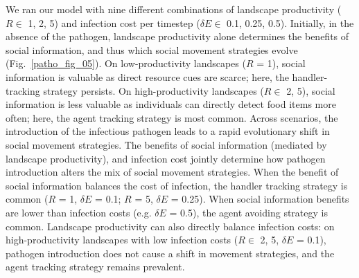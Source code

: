 We ran our model with nine different combinations of landscape productivity ($R \in $ 1, 2, 5) and infection cost per timestep ($\delta E \in$ 0.1, 0.25, 0.5).
Initially, in the absence of the pathogen, landscape productivity alone determines the benefits of social information, and thus which social movement strategies evolve (Fig.~\ref{patho_fig_05}).
On low-productivity landscapes ($R$ = 1), social information is valuable as direct resource cues are scarce; here, the handler-tracking strategy persists.
On high-productivity landscapes ($R \in$ 2, 5), social information is less valuable as individuals can directly detect food items more often; here, the agent tracking strategy is most common.
Across scenarios, the introduction of the infectious pathogen leads to a rapid evolutionary shift in social movement strategies.
The benefits of social information (mediated by landscape productivity), and infection cost jointly determine how pathogen introduction alters the mix of social movement strategies.
When the benefit of social information balances the cost of infection, the handler tracking strategy is common ($R$ = 1, $\delta E$ = 0.1; $R$ = 5, $\delta E$ = 0.25).
When social information benefits are lower than infection costs (e.g. $\delta E$ = 0.5), the agent avoiding strategy is common.
Landscape productivity can also directly balance infection costs: on high-productivity landscapes with low infection costs ($R \in$ 2, 5, $\delta E$ = 0.1), pathogen introduction does not cause a shift in movement strategies, and the agent tracking strategy remains prevalent.

